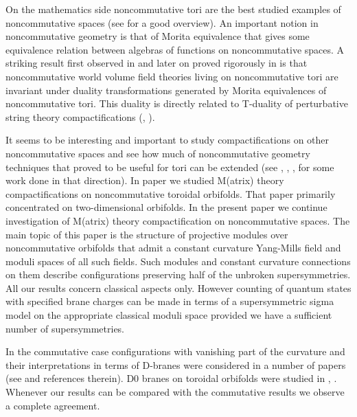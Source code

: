 \documentclass[a4paper,a4paper]{article}
\begin{document}
On the mathematics side noncommutative tori are the best studied examples of noncommutative spaces 
(see \cite{Rieffel1} for a good overview). An important notion in noncommutative geometry is that of 
Morita equivalence that gives some equivalence relation between algebras of functions on noncommutative spaces. 
A striking result first observed in \cite{CDS} and later on proved rigorously in \cite{ASMorita} is 
that noncommutative world volume field theories living on noncommutative tori are invariant under 
duality transformations generated by Morita equivalences of noncommutative tori. This duality 
is directly related to T-duality of perturbative string theory compactifications  (\cite{ASRieffel}, \cite{SeibWitt}).  


It seems to be    interesting and important to study compactifications on other noncommutative spaces and see 
how much of noncommutative geometry  techniques that proved to be useful for tori can be extended (see \cite{HoWu}, \cite{HoWu2}, 
\cite{ncRS}, \cite{z2} for some work done in that direction). 
In paper \cite{z2} 
we  studied  M(atrix) theory compactifications on noncommutative toroidal orbifolds.  
That paper primarily concentrated on 
 two-dimensional  \coordHE{} orbifolds. 
In the present paper we continue  investigation of  M(atrix) theory compactification on noncommutative spaces.
The main topic of this paper is the structure of projective modules over noncommutative orbifolds that admit a  
constant curvature 
Yang-Mills field  and moduli spaces of all such fields. Such modules and constant curvature connections 
on them describe configurations preserving half of the unbroken supersymmetries. 
 All our results concern classical aspects only. However  counting of quantum states 
with specified brane charges can be made in terms of a supersymmetric sigma model on the appropriate classical 
moduli space provided we have a sufficient number of supersymmetries. 


In the commutative case configurations with vanishing \coordHE{} part of the curvature and their interpretations 
in terms of D-branes were considered in a number of papers (see \cite{GurRamg}  and references 
therein). D0 branes on toroidal \coordHE{} orbifolds were studied in \cite{RamgWald}, \cite{GLY}. 
Whenever our results can be compared with the commutative results we observe a complete agreement.
\end{document}
